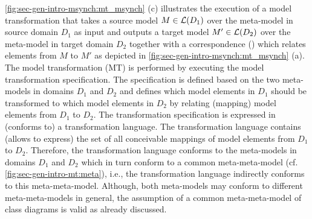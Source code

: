 \cref{fig:sec-gen-intro-msynch:mt_msynch} (c) illustrates the execution of a model transformation that takes a source model $M \in \mathcal{L}(D_1)$ over the meta-model in source domain $D_1$ as input and outputs a target model $M' \in \mathcal{L}(D_2)$ over the meta-model in target domain $D_2$ together with a correspondence () which relates elements from $M$ to $M'$ as depicted in \cref{fig:sec-gen-intro-msynch:mt_msynch} (a).
The model transformation (MT) is performed by executing the model transformation specification.
The specification is defined based on the two meta-models in domains $D_1$ and $D_2$ and defines which model elements in $D_1$ should be transformed to which model elements in $D_2$ by relating (mapping) model elements from $D_1$ to $D_2$.
The transformation specification is expressed in (conforms to) a transformation language.
The transformation language contains (allows to express) the set of all conceivable mappings of model elements from $D_1$ to $D_2$.
Therefore, the transformation language conforms to the meta-models in domains $D_1$ and $D_2$ which in turn conform to a common meta-meta-model (cf. \cref{fig:sec-gen-intro-mt:meta}), i.e., the transformation language indirectly conforms to this meta-meta-model.
Although, both meta-models may conform to different meta-meta-models in general, the assumption of a common meta-meta-model of class diagrams is valid as already discussed.

